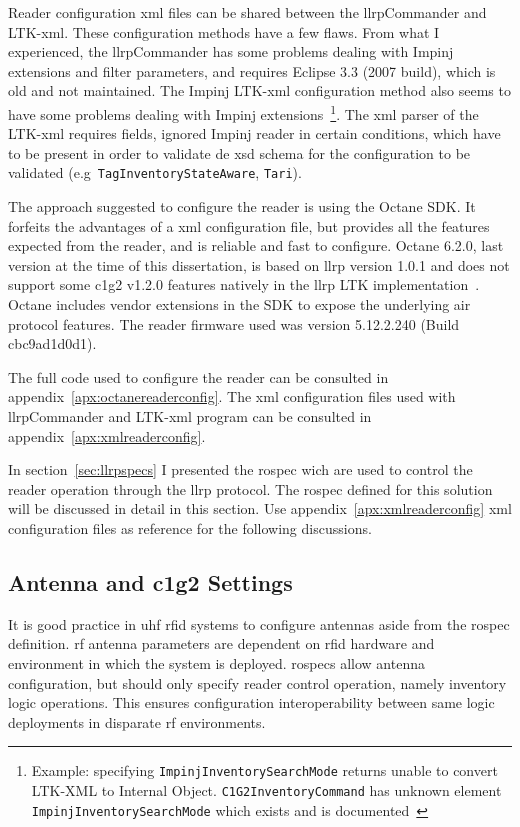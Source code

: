 Reader configuration \ac{xml} files can be shared between the \acs{llrp}Commander and LTK-\ac{xml}. These configuration methods have a few flaws. From what I experienced, the \ac{llrp}Commander has some problems dealing with Impinj extensions and filter parameters, and requires Eclipse $3.3$ (2007 build), which is old and not maintained.
The Impinj LTK-\ac{xml} configuration method also seems to have some problems dealing with Impinj extensions~\footnote{Example: specifying \texttt{ImpinjInventorySearchMode} returns unable to convert LTK-XML to Internal Object. \texttt{C1G2InventoryCommand} has unknown element \texttt{ImpinjInventorySearchMode} which exists and is documented~\cite{ImpinjLTKProgrammers}}.
The \ac{xml} parser of the LTK-\acs{xml} requires fields, ignored Impinj reader in certain conditions, which have to be present in order to validate de \ac{xsd} schema for the configuration to be validated (e.g\ \texttt{TagInventoryStateAware}, \texttt{Tari}).

The approach suggested to configure the reader is using the Octane SDK. It forfeits the advantages of a \ac{xml} configuration file, but provides all the features expected from the reader, and is reliable and fast to configure.
Octane 6.2.0, last version at the time of this dissertation, is based on \ac{llrp} version 1.0.1 and does not support some \ac{c1g2} v1.2.0 features natively in the \ac{llrp} LTK implementation~\cite{ImpinjOctaneLLRP}. Octane includes vendor extensions in the SDK to expose the underlying air protocol features.
The reader firmware used was version 5.12.2.240 (Build cbc9ad1d0d1).

The full code used to configure the reader can be consulted in appendix~\ref{apx:octanereaderconfig}.
The \ac{xml} configuration files used with \ac{llrp}Commander and LTK-\acs{xml} program can be consulted in appendix~\ref{apx:xmlreaderconfig}.

In section~\ref{sec:llrpspecs} I presented the \ac{rospec} wich are used to control the reader operation through the \ac{llrp} protocol. The \ac{rospec} defined for this solution will be discussed in detail in this section.
Use appendix~\ref{apx:xmlreaderconfig} \ac{xml} configuration files as reference for the following discussions.

\subsection{Antenna and \acs{c1g2} Settings}

It is good practice in \ac{uhf} \ac{rfid} systems to configure antennas aside from the \ac{rospec} definition. \ac{rf} antenna parameters are dependent on \ac{rfid} hardware and environment in which the system is deployed. \acp{rospec} allow antenna configuration, but should only specify reader control operation, namely inventory logic operations. This ensures configuration interoperability between same logic deployments in disparate \ac{rf} environments.

